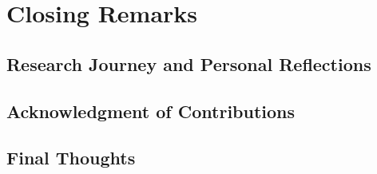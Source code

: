 \section{Closing Remarks}

\subsection{Research Journey and Personal Reflections}

\subsection{Acknowledgment of Contributions}

\subsection{Final Thoughts}

